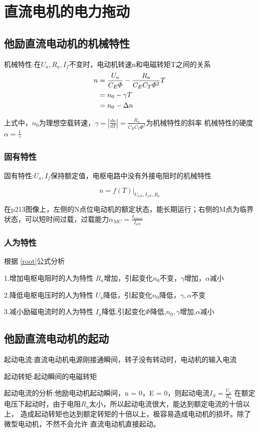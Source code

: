 \documentclass[11pt,twoside,a4paper]{ctexart}
\begin{document}
\section{直流电机的电力拖动}
\subsection{他励直流电动机的机械特性}
机械特性:在$U_a,R_a,I_f$不变时，电动机转速n和电磁转矩T之间的关系
\begin{align}
    n &= \frac{U_a}{C_E\varPhi } - \frac{R_a}{C_EC_T\varPhi ^2}T  \label{root}      \\
    & = n_0 - \gamma T \notag \\
    & = n_0 - \Delta n   \notag
\end{align}

上式中，$n_0$为理想空载转速，$\gamma = |\frac{dn}{dT}| = \frac{R_a}{C_EC_T\varPhi ^2}$为机械特性的斜率
机械特性的硬度$\alpha  = \frac{1}{\gamma }$

\subsubsection{固有特性}
固有特性:$U_a,I_f$保持额定值，电枢电路中没有外接电阻时的机械特性

\[n = f(T)|_{U_{aN},I_{fN},R_a}\]

在p213图像上，左侧的N点位电动机的额定状态，能长期运行；右侧的M点为临界状态，可以短时间过载，过载能力$\alpha _{MC} = \frac{I_{amax}}{I_{aN}}$

\subsubsection{人为特性}
根据 \eqref{root}公式分析

1.增加电枢电阻时的人为特性
$R_a$增加，引起变化$n_0$不变，$\gamma $增加，$\alpha $减小

2.降低电枢电压时的人为特性
$U_a$降低，引起变化$n_0$降低，$\gamma,\alpha $不变

3.减小励磁电流时的人为特性
$I_a$降低,引起变化$\varPhi $降低,$n_0,\gamma$增加,$\alpha $减小

\subsection{他励直流电动机的起动}
起动电流:直流电动机电源刚接通瞬间，转子没有转动时，电动机的输入电流

起动转矩:起动瞬间的电磁转矩

起动电流的分析:他励电动机起动瞬间，n = 0，E = 0，则起动电流$I_S = \frac{U_a}{R_a}$
在额定电压下起动时，由于电阻$R_a$太小，所以起动电流很大，能达到额定电流的十倍以上，
造成起动转矩也达到额定转矩的十倍以上，极容易造成电动机的损坏。除了微型电动机，不然不会允许
直流电动机直接起动。
\end{document}
